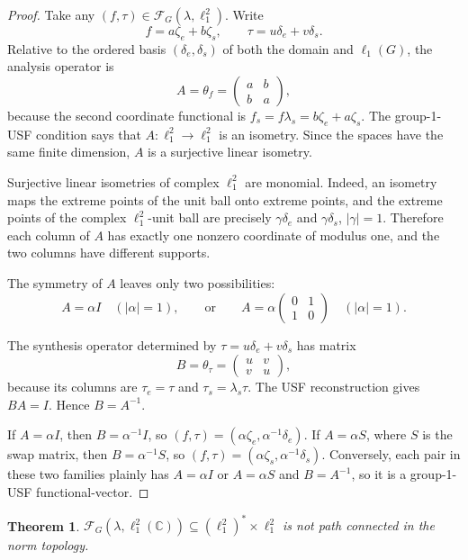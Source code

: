 \documentclass[11pt]{article}
\newtheorem{theorem}{Theorem}
\newcommand{\C}{\mathbb C}
\newcommand{\FG}{\mathscr F_G}
\newcommand{\de}{\delta_e}
\newcommand{\ds}{\delta_s}
\newcommand{\ze}{\zeta_e}
\newcommand{\zs}{\zeta_s}
\begin{document}
\begin{proof}
Take any \((f,\tau)\in\FG(\lambda,\ell_1^2)\). Write
\[
  f=a\ze+b\zs,\qquad \tau=u\de+v\ds.
\]
Relative to the ordered basis \((\de,\ds)\) of both the domain and
\(\ell_1(G)\), the analysis operator is
\[
  A=\theta_f=
  \begin{pmatrix}
    a & b\\
    b & a
  \end{pmatrix},
\]
because the second coordinate functional is
\(f_s=f\lambda_s=b\ze+a\zs\). The group-1-USF condition says that
\(A:\ell_1^2\to\ell_1^2\) is an isometry. Since the spaces have the same
finite dimension, \(A\) is a surjective linear isometry.

Surjective linear isometries of complex \(\ell_1^2\) are monomial. Indeed, an
isometry maps the extreme points of the unit ball onto extreme points, and the
extreme points of the complex \(\ell_1^2\)-unit ball are precisely
\(\gamma\de\) and \(\gamma\ds\), \(|\gamma|=1\). Therefore each column of
\(A\) has exactly one nonzero coordinate of modulus one, and the two columns
have different supports.

The symmetry of \(A\) leaves only two possibilities:
\[
  A=\alpha I\quad(|\alpha|=1),
  \qquad\text{or}\qquad
  A=\alpha
  \begin{pmatrix}
  0&1\\
  1&0
  \end{pmatrix}
  \quad(|\alpha|=1).
\]

The synthesis operator determined by \(\tau=u\de+v\ds\) has matrix
\[
  B=\theta_\tau=
  \begin{pmatrix}
    u & v\\
    v & u
  \end{pmatrix},
\]
because its columns are \(\tau_e=\tau\) and \(\tau_s=\lambda_s\tau\). The USF
reconstruction gives \(BA=I\). Hence \(B=A^{-1}\).

If \(A=\alpha I\), then \(B=\alpha^{-1}I\), so
\((f,\tau)=(\alpha\ze,\alpha^{-1}\de)\). If \(A=\alpha S\), where \(S\) is the
swap matrix, then \(B=\alpha^{-1}S\), so
\((f,\tau)=(\alpha\zs,\alpha^{-1}\ds)\). Conversely, each pair in these two
families plainly has \(A=\alpha I\) or \(A=\alpha S\) and
\(B=A^{-1}\), so it is a group-1-USF functional-vector.
\end{proof}

\begin{theorem}
\(\FG(\lambda,\ell_1^2(\C))\subseteq(\ell_1^2)^*\times\ell_1^2\) is not path
connected in the norm topology.
\end{theorem}
\end{document}
